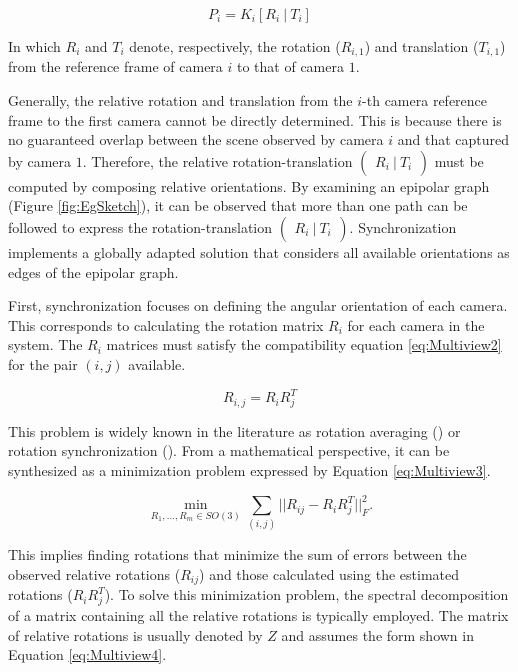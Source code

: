 \begin{equation}
  \label{eq:Multiview1}
  P_i = K_i [R_i \ | \ T_i] 
\end{equation}

In which $R_i$ and $T_i$ denote, respectively, the rotation ($R_{i,1}$) and translation ($T_{i,1}$) from the reference frame of camera $i$ to that of camera $1$.

Generally, the relative rotation and translation from the $i$-th camera reference frame to the first camera cannot be directly determined. This is because there is no guaranteed overlap between the scene observed by camera $i$ and that captured by camera $1$. Therefore, the relative rotation-translation $\begin{pmatrix} R_i \ | \ T_i \end{pmatrix}$ must be computed by composing relative orientations. By examining an epipolar graph (Figure \ref{fig:EgSketch}), it can be observed that more than one path can be followed to express the rotation-translation $\begin{pmatrix} R_i \ | \ T_i \end{pmatrix}$. Synchronization implements a globally adapted solution that considers all available orientations as edges of the epipolar graph.

First, synchronization focuses on defining the angular orientation of each camera. This corresponds to calculating the rotation matrix $R_i$ for each camera in the system. The $R_i$ matrices must satisfy the compatibility equation \ref{eq:Multiview2} for the pair $(i, j)$ available.

\begin{equation}
  \label{eq:Multiview2}
  R_{i,j} = R_i R_j^T
\end{equation}

This problem is widely known in the literature as rotation averaging (\cite{Hartley2013}) or rotation synchronization (\cite{Singer2011}). From a mathematical perspective, it can be synthesized as a minimization problem expressed by Equation \ref{eq:Multiview3}.

\begin{equation}
  \label{eq:Multiview3}
  \min_{R_1, \dots, R_m \in SO(3)} \sum_{(i,j)} ||R_{ij} - R_i R_j^T||_F^2.
\end{equation}

This implies finding rotations that minimize the sum of errors between the observed relative rotations ($R_{ij}$) and those calculated using the estimated rotations ($R_i R_j^T$).
To solve this minimization problem, the spectral decomposition of a matrix containing all the relative rotations is typically employed.
The matrix of relative rotations is usually denoted by $Z$ and assumes the form shown in Equation \ref{eq:Multiview4}.

